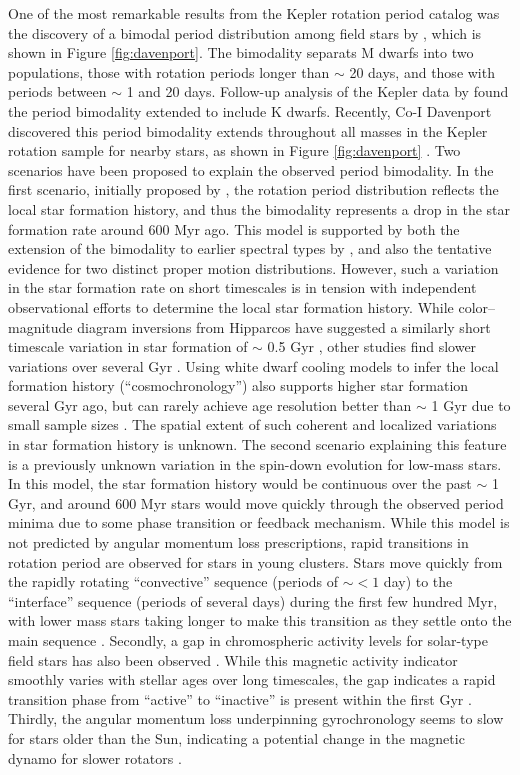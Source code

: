 \documentclass[useAMS, usenatbib, preprint, 12pt]{aastex}
\newcommand{\eg}{{\it e.g.}}
\begin{document}
One of the most remarkable results from the Kepler rotation period catalog was
the discovery of a bimodal period distribution among field stars by
\citet{mcquillan2013}, which is shown in Figure \ref{fig:davenport}.
The bimodality separats M dwarfs into two populations, those with rotation
periods longer than $\sim$ 20 days, and those with periods between $\sim$ 1
and 20 days.
Follow-up analysis of the Kepler data by \citet{mcquillan2014} found the
period bimodality extended to include K dwarfs.
Recently, Co-I Davenport discovered this period bimodality extends throughout
all masses in the Kepler rotation sample for nearby stars, as shown in Figure
\ref{fig:davenport} \citep{davenport2017}.
Two scenarios have been proposed to explain the observed period bimodality.
In the first scenario, initially proposed by \citet{mcquillan2013}, the
rotation period distribution reflects the local star formation history, and
thus the bimodality represents a drop in the star formation rate around 600
Myr ago.
This model is supported by both the extension of the bimodality to earlier
spectral types by \citet{davenport2017}, and also the tentative evidence for
two distinct proper motion distributions.
However, such a variation in the star formation rate on short timescales is in
tension with independent observational efforts to determine the local star
formation history.
While color–magnitude diagram inversions from Hipparcos have suggested a
similarly short timescale variation in star formation of $\sim$ 0.5 Gyr
\citep{hernandez2000}, other studies find slower variations over several
Gyr \citep[\eg][]{cignoni2006}.
Using white dwarf cooling models to infer the local formation history
(“cosmochronology”) also supports higher star formation several Gyr ago, but
can rarely achieve age resolution better than $\sim$ 1 Gyr due to small sample
sizes \citep{tremblay2014}.
The spatial extent of such coherent and localized variations in star formation
history is unknown.
The second scenario explaining this feature is a previously unknown variation
in the spin-down evolution for low-mass stars.
In this model, the star formation history would be continuous over the past
$\sim$ 1 Gyr, and around 600 Myr stars would move quickly through the observed
period minima due to some phase transition or feedback mechanism.
While this model is not predicted by angular momentum loss prescriptions,
rapid transitions in rotation period are observed for stars in young clusters.
Stars move quickly from the rapidly rotating “convective” sequence (periods of
$\sim<1$ day) to the “interface” sequence (periods of several days) during the
first few hundred Myr, with lower mass stars taking longer to make this
transition as they settle onto the main sequence \citep{barnes2003}.
Secondly, a gap in chromospheric activity levels for solar-type field stars
has also been observed \citep{vaughan1980}.
While this magnetic activity indicator smoothly varies with stellar ages over
long timescales, the gap indicates a rapid transition phase from “active” to
“inactive” is present within the first Gyr \citep{pace2009}.
Thirdly, the angular momentum loss underpinning gyrochronology seems to slow
for stars older than the Sun, indicating a potential change in the magnetic
dynamo for slower rotators \citep{angus2015, van-saders2016}.
\end{document}
